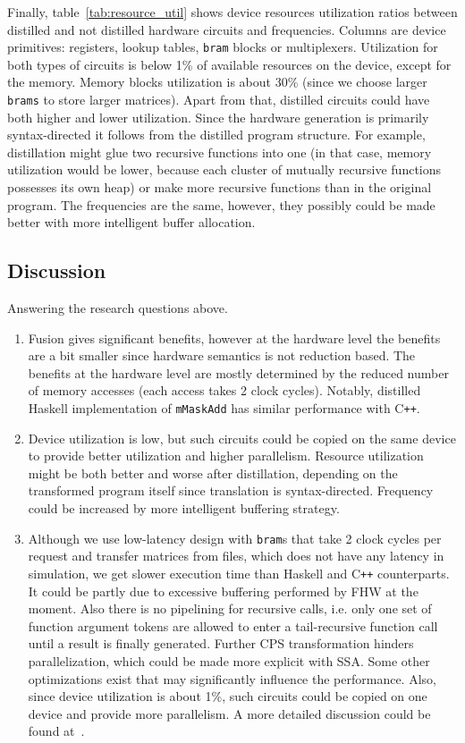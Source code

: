 Finally, table~\ref{tab:resource_util} shows device resources utilization ratios between distilled and not distilled hardware circuits and frequencies. Columns are device primitives: registers, lookup tables, \texttt{bram} blocks or multiplexers. Utilization for both types of circuits is below 1\% of available resources on the device, except for the memory. Memory blocks utilization is about 30\% (since we choose larger \texttt{brams} to store larger matrices). Apart from that, distilled circuits could have both higher and lower utilization. Since the hardware generation is primarily syntax-directed it follows from the distilled program structure. For example, distillation might glue two recursive functions into one (in that case, memory utilization would be lower, because each cluster of mutually recursive functions possesses its own heap) or make more recursive functions than in the original program. The frequencies are the same, however, they possibly could be made better with more intelligent buffer allocation.

\subsection{Discussion}
Answering the research questions above.

\begin{enumerate}
    \item Fusion gives significant benefits, however at the hardware level the benefits are a bit smaller since hardware semantics is not reduction based. The benefits at the hardware level are mostly determined by the reduced number of memory accesses (each access takes 2 clock cycles). Notably, distilled Haskell implementation of \texttt{mMaskAdd} has similar performance with C\texttt{++}. 
    \item Device utilization is low, but such circuits could be copied on the same device to provide better utilization and higher parallelism. Resource utilization might be both better and worse after distillation, depending on the transformed program itself since translation is syntax-directed. Frequency could be increased by more intelligent buffering strategy.
    \item Although we use low-latency design with \texttt{bram}s that take 2 clock cycles per request and transfer matrices from files, which does not have any latency in simulation, we get slower execution time than Haskell and C\texttt{++} counterparts. It could be partly due to excessive buffering performed by FHW at the moment. Also there is no pipelining for recursive calls, i.e. only one set
of function argument tokens are allowed to enter a tail-recursive function call until a result is finally generated. Further CPS transformation hinders parallelization, which could be made more explicit with SSA. Some other optimizations exist that may significantly influence the performance. Also, since device utilization is about 1\%, such circuits could be copied on one device and provide more parallelism. A more detailed discussion could be found at~\cite{Edwards2019FHWP}.
\end{enumerate}

